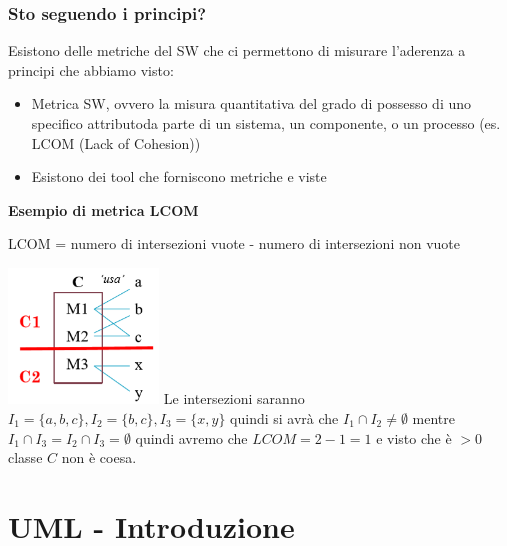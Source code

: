 \documentclass[12pt, a4paper]{report}
\begin{document}
\subsection{Sto seguendo i principi?}
Esistono delle metriche del SW che ci permettono di misurare l'aderenza a principi che abbiamo visto:
\begin{itemize}
    \item Metrica SW, ovvero la misura quantitativa del grado di possesso di uno specifico attributoda parte di un sistema, un componente, o un processo (es. LCOM (Lack of Cohesion))
    \item Esistono dei tool che forniscono  metriche e viste
\end{itemize}
\textbf{Esempio di metrica LCOM}
\begin{center}
    LCOM = numero di intersezioni vuote - numero di intersezioni non vuote
\end{center}
\includegraphics[width=0.3\textwidth]{Immagini/esempioLCOM.png}
Le intersezioni saranno $I_{1}=\{a,b,c\},I_{2}=\{b,c\},I_{3}=\{x,y\}$ quindi si avrà che $I_{1}\cap I_{2} \neq \emptyset $ mentre $I_{1}\cap I_{3} =I_{2}\cap I_{3} = \emptyset$ quindi avremo che $LCOM = 2-1 = 1$ e visto che è $>0$ classe $C$ non è coesa.
\chapter{UML - Introduzione}
\end{document}
